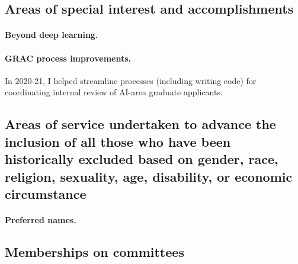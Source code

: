 \documentclass[10pt]{article}
\begin{document}




\subsection{Areas of special interest and accomplishments}

\paragraph{Beyond deep learning.}

\paragraph{GRAC process improvements.}
In 2020-21, I helped streamline processes (including writing code) for coordinating internal review of AI-area graduate applicants.


\subsection{Areas of service undertaken to advance the inclusion of all those who have been historically excluded based on gender, race, religion, sexuality, age, disability, or economic circumstance}

\paragraph{Preferred names.}


\subsection{Memberships on committees} %
\end{document}
